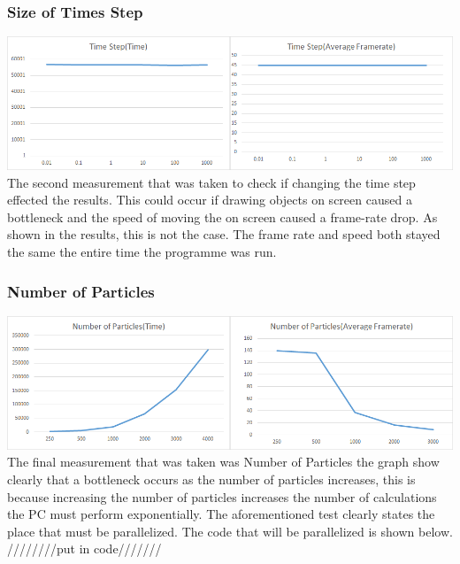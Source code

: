 \documentclass[12pt]{article}
\begin{document}
\subsubsection{Size of Times Step}
\includegraphics[scale=0.5]{pics/iatime.png}
\newline
The second measurement that was taken to check if changing the time step effected the results. This could occur if drawing objects on screen caused a bottleneck and the speed of moving the on screen caused a frame-rate drop. As shown in the results, this is not the case. The frame rate and speed both stayed the same the entire time the programme was run.
\subsubsection{ Number of Particles}
\includegraphics[scale=0.5]{pics/ianumber.png}
\newline
The final measurement that was taken was Number of Particles the graph show clearly that a bottleneck occurs as the number of particles increases, this is because increasing the number of particles increases the number of calculations the PC must perform exponentially. The aforementioned test clearly states the place that must be parallelized. The code that will be parallelized is shown below.
////////put in code/////// 
\newline
	
\end{document}
